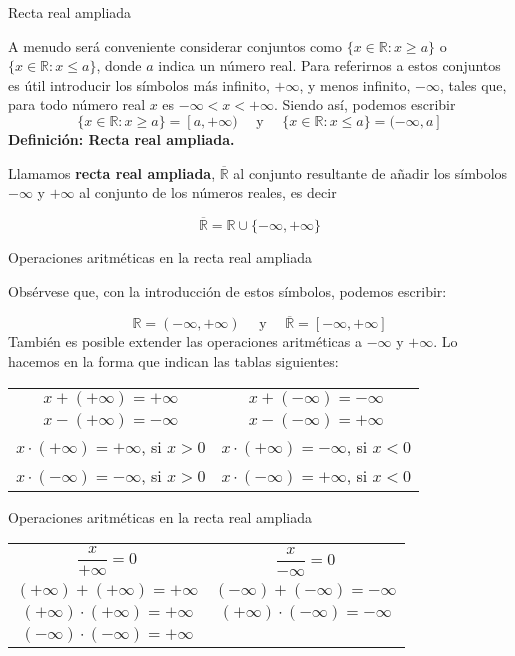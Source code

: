 \documentclass[
  ignorenonframetext,
]{beamer}
\begin{document}
\begin{frame}{Recta real ampliada}
\protect\hypertarget{recta-real-ampliada}{}

A menudo será conveniente considerar conjuntos como
\(\{ x \in \mathbb{R}: x \geq a \}\) o
\(\{x \in \mathbb{R}: x \leq a \}\), donde \(a\) indica un número real.
Para referirnos a estos conjuntos es útil introducir los símbolos más
infinito, \(+ \infty\), y menos infinito, \(- \infty\), tales que, para
todo número real \(x\) es \(-\infty < x < +\infty\). Siendo así, podemos
escribir \[
\{ x \in \mathbb{R}: x \geq a \} = [a,+\infty) \quad  \text{ y } \quad \{ x \in \mathbb{R}: x \leq a \} = (-\infty,a]
\] \textbf{Definición: Recta real ampliada.}

Llamamos \textbf{recta real ampliada}, \(\overline{\mathbb{R}}\) al
conjunto resultante de añadir los símbolos \(-\infty\) y \(+\infty\) al
conjunto de los números reales, es decir

\[
\overline{\mathbb{R}} = \mathbb{R} \cup \{ -\infty,+\infty \}
\]

\end{frame}

\begin{frame}{Operaciones aritméticas en la recta real ampliada}
\protect\hypertarget{operaciones-aritmuxe9ticas-en-la-recta-real-ampliada}{}

Obsérvese que, con la introducción de estos símbolos, podemos escribir:

\[
\mathbb{R}=(-\infty,+\infty) \quad \text{ y } \quad \overline{\mathbb{R}} = [-\infty,+\infty]
\] También es posible extender las operaciones aritméticas a
\(- \infty\) y \(+\infty\). Lo hacemos en la forma que indican las
tablas siguientes:

\begin{longtable}[]{@{}cc@{}}
\toprule
\endhead
\(x+(+\infty) = +\infty\) & \(x+(-\infty) = -\infty\)\tabularnewline
\(x-(+\infty) = -\infty\) & \(x-(-\infty) = +\infty\)\tabularnewline
\(x \cdot (+\infty) = +\infty\), si \(x>0\) &
\(x \cdot (+\infty) = -\infty\), si \(x<0\)\tabularnewline
\(x \cdot (-\infty) = -\infty\), si \(x>0\) &
\(x \cdot (-\infty) = +\infty\), si \(x<0\)\tabularnewline
\bottomrule
\end{longtable}

\end{frame}

\begin{frame}{Operaciones aritméticas en la recta real ampliada}
\protect\hypertarget{operaciones-aritmuxe9ticas-en-la-recta-real-ampliada-1}{}

\begin{longtable}[]{@{}cc@{}}
\toprule
\endhead
\(\dfrac{x}{+\infty} =0\) & \(\dfrac{x}{-\infty} =0\)\tabularnewline
\((+\infty) + (+\infty) = +\infty\) &
\((-\infty) + (-\infty)= -\infty\)\tabularnewline
\((+\infty) \cdot (+\infty) = +\infty\) &
\((+\infty) \cdot (-\infty) = -\infty\)\tabularnewline
\((-\infty) \cdot (-\infty) = +\infty\) &\tabularnewline
\bottomrule
\end{longtable}

\end{frame}
\end{document}
